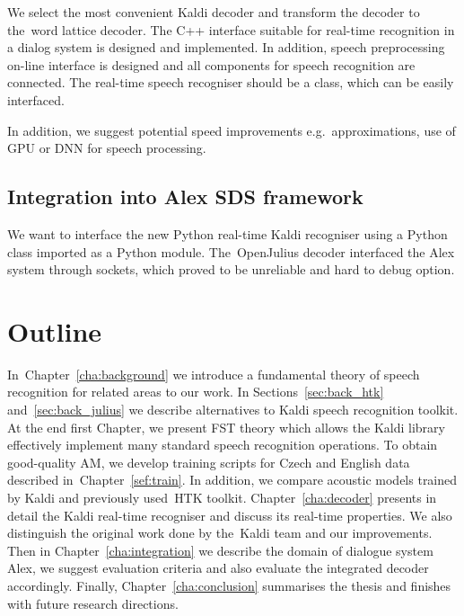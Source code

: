 We select the most convenient Kaldi decoder and transform the decoder to the~word lattice decoder. 
The C++ interface suitable for real-time recognition in a dialog system is designed and implemented.
In addition, speech preprocessing on-line interface is designed and all components for speech recognition
are connected.
The real-time speech recogniser should be a class, which can be easily interfaced.

In addition, we suggest potential speed improvements e.g.\ approximations, use of \ac{GPU} 
or \ac{DNN} for speech processing\cite{vesely2013sequencediscriminative}.

\subsection[Integration into Alex \acs{SDS} framework]{Integration into Alex \acl{SDS} framework} 
\label{sub:integration}
We want to interface the new Python real-time Kaldi recogniser using a Python class imported as a Python module.
The~OpenJulius decoder interfaced the Alex system through sockets, which proved to be unreliable and hard to debug option.


\section*{Outline} 
In~Chapter~\ref{cha:background} we introduce a fundamental theory of speech recognition for related areas to our work.
In Sections~\ref{sec:back_htk} and~\ref{sec:back_julius} we describe alternatives to Kaldi speech recognition toolkit. 
At the end first Chapter, we present \ac{FST} theory which allows the Kaldi library effectively implement many standard speech recognition operations. 
To obtain good-quality \acl{AM}, we develop training scripts for Czech and English data described in~Chapter~\ref{sef:train}. 
In addition, we compare acoustic models trained by Kaldi and previously used~\ac{HTK} toolkit. 
Chapter~\ref{cha:decoder} presents in detail the Kaldi real-time recogniser and discuss its real-time properties.
We also distinguish the original work done by the~Kaldi team and our improvements. 
Then in Chapter~\ref{cha:integration} we describe the domain of dialogue system Alex, we suggest evaluation criteria and also evaluate the integrated decoder accordingly.
Finally, Chapter~\ref{cha:conclusion} summarises the thesis and finishes with future research directions.
